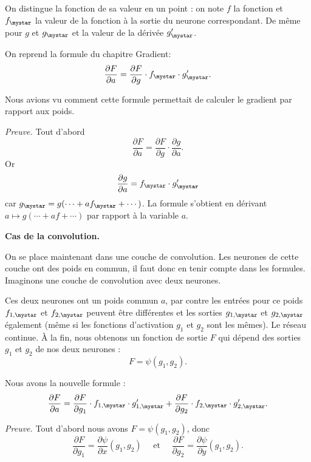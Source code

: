 \documentclass[11pt,class=report,crop=false]{standalone}
\begin{document}
On distingue la fonction de sa valeur en un point : on note $f$ la fonction et $f_\mystar$ la valeur de la fonction à la sortie du neurone correspondant. De même pour $g$ et $g_\mystar$ et la valeur de la dérivée $g'_\mystar$.



On reprend la formule du chapitre \og{}Gradient\fg{}:
$$\frac{\partial F}{\partial a} = \frac{\partial F}{\partial g} \cdot f_\mystar \cdot  g'_\mystar.$$

Nous avions vu comment cette formule permettait de calculer le gradient par rapport aux poids.


\emph{Preuve.}
Tout d'abord $$\frac{\partial F}{\partial a} =  \frac{\partial F}{\partial g} \cdot \frac{\partial g}{\partial a}.$$
Or 
$$\frac{\partial g}{\partial a} = f_\mystar \cdot g'_\mystar$$
car 
$g_\mystar = g(\cdots + a f_\mystar+\cdots)$. La formule s'obtient en dérivant $a \mapsto g(\cdots + a f +\cdots)$ par rapport à la variable $a$.

\textbf{Cas de la convolution.}

On se place maintenant dans une couche de convolution. Les neurones de cette couche ont des poids en commun, il faut donc en tenir compte dans les formules.
Imaginons une couche de convolution avec deux neurones.



Ces deux neurones ont un poids commun $a$, par contre les entrées pour ce poids 
$f_{1,\mystar}$ et $f_{2,\mystar}$ peuvent être différentes et les sorties $g_{1,\mystar}$ et $g_{2,\mystar}$ également (même si les fonctions d'activation $g_1$ et $g_2$ sont les mêmes).
Le réseau continue. À la fin, nous obtenons un fonction de sortie $F$ qui dépend des sorties $g_1$ et $g_2$ de nos deux neurones  :
$$F = \psi(g_1,g_2).$$


Nous avons la nouvelle formule :
$$\frac{\partial F}{\partial a} = \frac{\partial F}{\partial g_1} \cdot f_{1,\mystar} \cdot  g'_{1,\mystar} + \frac{\partial F}{\partial g_2} \cdot f_{2,\mystar} \cdot  g'_{2,\mystar}.$$


\emph{Preuve.}
Tout d'abord nous avons $F = \psi(g_1,g_2)$, donc
$$\frac{\partial F}{\partial g_1} = \frac{\partial \psi}{\partial x}(g_1,g_2)
\quad\text{ et }\quad
\frac{\partial F}{\partial g_2} = \frac{\partial \psi}{\partial y}(g_1,g_2).$$
\end{document}
